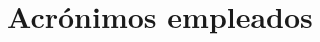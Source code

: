 \documentclass[11pt,spanish,listoffigures]{tfgetsinf}
\begin{document}



\APPENDIX


\chapter{Acrónimos empleados}
\end{document}

